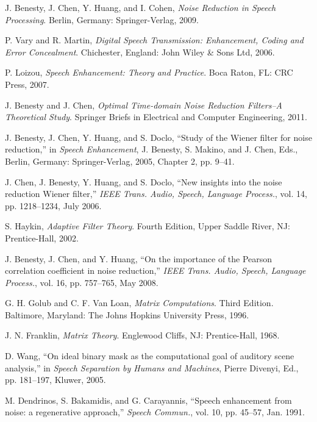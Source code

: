 \documentclass[10pt,pdflatex,headrule,landscape]{beamer}
\begin{document}
\begin{frame}[allowframebreaks]
\footnotesize
\setlength{\parskip}{0em}

\begin{thebibliography}{99}
%
J. Benesty, J. Chen, Y. Huang, and I. Cohen, \emph{Noise Reduction in Speech Processing}. Berlin, Germany: Springer-Verlag, 2009.

P. Vary and R. Martin, \emph{Digital Speech Transmission: Enhancement, Coding and Error Concealment}. Chichester, England: John Wiley \& Sons Ltd, 2006.

P. Loizou, \emph{Speech Enhancement: Theory and Practice}. Boca Raton, FL: CRC Press, 2007.

J. Benesty and J. Chen, \emph{Optimal Time-domain Noise Reduction Filters--A Theoretical Study}. Springer Briefs in Electrical and Computer Engineering, 2011.

J. Benesty, J. Chen, Y. Huang, and S. Doclo, ``Study of the Wiener filter for noise reduction,'' in \emph{Speech Enhancement}, J. Benesty, S. Makino, and J. Chen, Eds., Berlin, Germany: Springer-Verlag, 2005, Chapter 2, pp. 9--41.

J. Chen, J. Benesty, Y. Huang, and S. Doclo, ``New insights into the noise reduction Wiener filter,'' \emph{IEEE Trans. Audio, Speech, Language Process.}, vol. 14, pp. 1218--1234, July 2006.

S. Haykin, \emph{Adaptive Filter Theory}. Fourth Edition, Upper Saddle River, NJ: Prentice-Hall, 2002.

J. Benesty, J. Chen, and Y. Huang, ``On the importance of the Pearson correlation coefficient in noise reduction,'' \emph{IEEE Trans. Audio, Speech, Language Process.}, vol. 16, pp. 757--765, May 2008.

G. H. Golub and C. F. Van Loan, \emph{Matrix Computations}. Third Edition. Baltimore, Maryland: The Johns Hopkins University Press, 1996.

J. N. Franklin, \emph{Matrix Theory}. Englewood Cliffs, NJ: Prentice-Hall, 1968.

D. Wang, ``On ideal binary mask as the computational goal of auditory scene analysis,'' in \emph{Speech Separation by Humans and Machines}, Pierre Divenyi, Ed., pp. 181--197, Kluwer, 2005.

M. Dendrinos, S. Bakamidis, and G. Carayannis, ``Speech enhancement from noise: a regenerative approach,'' \emph{Speech Commun.}, vol. 10, pp. 45--57, Jan. 1991.


\end{thebibliography}
\end{frame}
\end{document}
